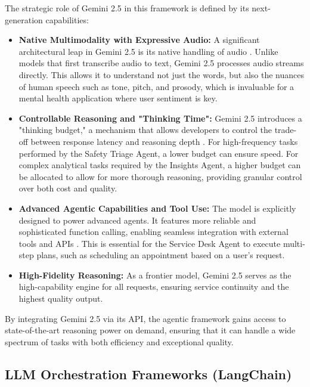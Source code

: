 The strategic role of Gemini 2.5 in this framework is defined by its next-generation capabilities:
\begin{itemize}
    \item \textbf{Native Multimodality with Expressive Audio:} A significant architectural leap in Gemini 2.5 is its native handling of audio \cite{googleblogaudio2025}. Unlike models that first transcribe audio to text, Gemini 2.5 processes audio streams directly. This allows it to understand not just the words, but also the nuances of human speech such as tone, pitch, and prosody, which is invaluable for a mental health application where user sentiment is key.
    \item \textbf{Controllable Reasoning and "Thinking Time":} Gemini 2.5 introduces a "thinking budget," a mechanism that allows developers to control the trade-off between response latency and reasoning depth \cite{google2025gemini2_5}. For high-frequency tasks performed by the Safety Triage Agent, a lower budget can ensure speed. For complex analytical tasks required by the Insights Agent, a higher budget can be allocated to allow for more thorough reasoning, providing granular control over both cost and quality.
    \item \textbf{Advanced Agentic Capabilities and Tool Use:} The model is explicitly designed to power advanced agents. It features more reliable and sophisticated function calling, enabling seamless integration with external tools and APIs \cite{google2025gemini2_5}. This is essential for the Service Desk Agent to execute multi-step plans, such as scheduling an appointment based on a user's request.
    \item \textbf{High-Fidelity Reasoning:} As a frontier model, Gemini 2.5 serves as the high-capability engine for all requests, ensuring service continuity and the highest quality output.
\end{itemize}

By integrating Gemini 2.5 via its API, the agentic framework gains access to state-of-the-art reasoning power on demand, ensuring that it can handle a wide spectrum of tasks with both efficiency and exceptional quality.


\subsection{LLM Orchestration Frameworks (LangChain)}
\label{subsec:langchain}

